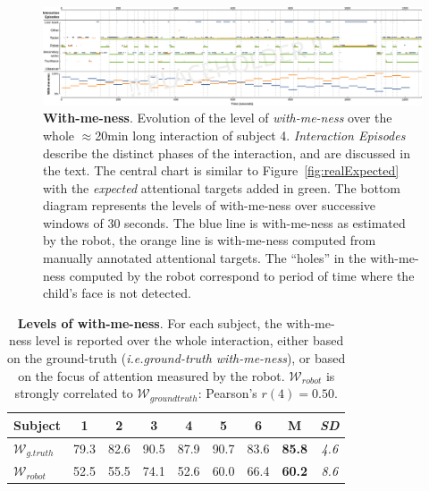 \documentclass{sig-alternate}
\newcommand{\ie}{\textit{i.e.}\xspace}
\begin{document}
\begin{figure}
    \centering
    \includegraphics[width=\linewidth]{with-me-ness}
    \caption{\small \textbf{With-me-ness}. Evolution of the level of
        \emph{with-me-ness} over the whole $\approx$20min long interaction of
        subject 4. \emph{Interaction Episodes} describe the distinct phases of
        the interaction, and are discussed in the text. The central chart is
        similar to Figure~\ref{fig:realExpected} with the \emph{expected}
        attentional targets added in green. The bottom diagram represents the
        levels of with-me-ness over successive windows of 30 seconds. The blue
        line is with-me-ness as estimated by the robot, the orange line is
        with-me-ness computed from manually annotated attentional targets. The
        ``holes'' in the with-me-ness computed by the robot correspond to period of time
        where the child's face is not detected.}

    \label{fig:with-me-ness}
\end{figure}


\begin{table}[h!]
    \centering
    \caption{\textbf{Levels of with-me-ness}. For each subject, the with-me-ness
    level is reported over the whole interaction, either based on the
    ground-truth (\ie \emph{ground-truth with-me-ness}), or based on the focus of
    attention measured by the robot. $\mathcal{W}_{robot}$ is strongly correlated to
    $\mathcal{W}_{groundtruth}$: Pearson's $r(4)=0.50$.}

    \begin{tabular}{p{1cm}cccccccc}
        \toprule
        Subject & 1 & 2 & 3 & 4 & 5 & 6 & {\bf M} & {\it SD} \\
        \midrule
        $\mathcal{W}_{g.truth}$ & 79.3 & 82.6  & 90.5 & 87.9 & 90.7 & 83.6 & {\bf 85.8} & {\it 4.6} \\ 
        $\mathcal{W}_{robot}$ & 52.5 & 55.5 & 74.1 & 52.6 & 60.0 & 66.4 & {\bf 60.2} & {\it 8.6} \\
        \bottomrule
    \end{tabular}
    \label{tab:results-with-me-ness}
\end{table}
\end{document}
